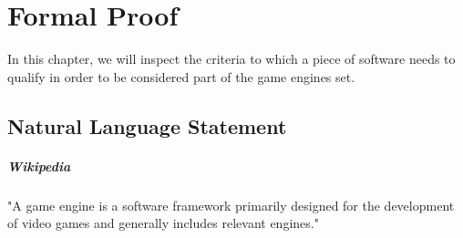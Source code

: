


\chapter*{Formal Proof}

In this chapter, we will inspect the criteria to which a piece of software needs to qualify in order to be considered part of the game engines set.

\section*{Natural Language Statement}



\paragraph*{Wikipedia}
"A game engine is a software framework primarily designed for the development of video games and generally includes relevant engines."






